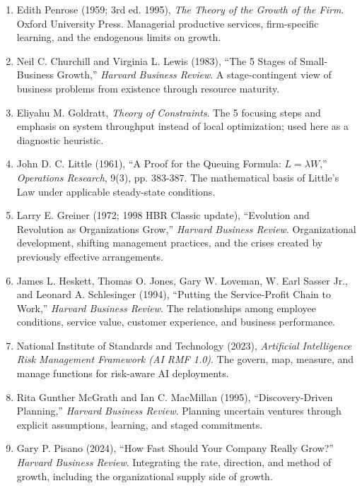 \begin{enumerate}
    \item[\textbf{[R1]}] Edith Penrose (1959; 3rd ed. 1995), \textit{The Theory of the Growth of the Firm}. Oxford University Press. Managerial productive services, firm-specific learning, and the endogenous limits on growth.
    \item[\textbf{[R2]}] Neil C. Churchill and Virginia L. Lewis (1983), ``The 5 Stages of Small-Business Growth,'' \textit{Harvard Business Review}. A stage-contingent view of business problems from existence through resource maturity.
    \item[\textbf{[R3]}] Eliyahu M. Goldratt, \textit{Theory of Constraints}. The 5 focusing steps and emphasis on system throughput instead of local optimization; used here as a diagnostic heuristic.
    \item[\textbf{[R4]}] John D. C. Little (1961), ``A Proof for the Queuing Formula: $L = \lambda W$,'' \textit{Operations Research}, 9(3), pp. 383-387. The mathematical basis of Little's Law under applicable steady-state conditions.
    \item[\textbf{[R5]}] Larry E. Greiner (1972; 1998 HBR Classic update), ``Evolution and Revolution as Organizations Grow,'' \textit{Harvard Business Review}. Organizational development, shifting management practices, and the crises created by previously effective arrangements.
    \item[\textbf{[R6]}] James L. Heskett, Thomas O. Jones, Gary W. Loveman, W. Earl Sasser Jr., and Leonard A. Schlesinger (1994), ``Putting the Service-Profit Chain to Work,'' \textit{Harvard Business Review}. The relationships among employee conditions, service value, customer experience, and business performance.
    \item[\textbf{[R7]}] National Institute of Standards and Technology (2023), \textit{Artificial Intelligence Risk Management Framework (AI RMF 1.0)}. The govern, map, measure, and manage functions for risk-aware AI deployments.
    \item[\textbf{[R8]}] Rita Gunther McGrath and Ian C. MacMillan (1995), ``Discovery-Driven Planning,'' \textit{Harvard Business Review}. Planning uncertain ventures through explicit assumptions, learning, and staged commitments.
    \item[\textbf{[R9]}] Gary P. Pisano (2024), ``How Fast Should Your Company Really Grow?'' \textit{Harvard Business Review}. Integrating the rate, direction, and method of growth, including the organizational supply side of growth.

\end{enumerate}

